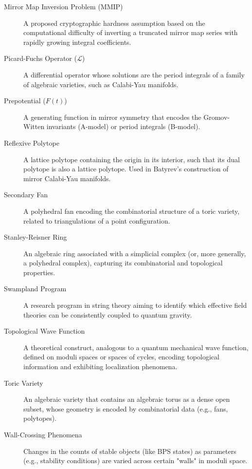 \documentclass{book}
\newcommand{\tmap}{t} %
\newcommand{\Fgen}{F} %
\theoremstyle{definition}
\begin{document}
\begin{description}
    \item[Mirror Map Inversion Problem (MMIP)] A proposed cryptographic hardness assumption based on the computational difficulty of inverting a truncated mirror map series with rapidly growing integral coefficients.
    \item[Picard-Fuchs Operator ($\mathcal{L}$)] A differential operator whose solutions are the period integrals of a family of algebraic varieties, such as Calabi-Yau manifolds.
    \item[Prepotential ($\Fgen(\tmap)$)] A generating function in mirror symmetry that encodes the Gromov-Witten invariants (A-model) or period integrals (B-model).
    \item[Reflexive Polytope] A lattice polytope containing the origin in its interior, such that its dual polytope is also a lattice polytope. Used in Batyrev's construction of mirror Calabi-Yau manifolds.
    \item[Secondary Fan] A polyhedral fan encoding the combinatorial structure of a toric variety, related to triangulations of a point configuration.
    \item[Stanley-Reisner Ring] An algebraic ring associated with a simplicial complex (or, more generally, a polyhedral complex), capturing its combinatorial and topological properties.
    \item[Swampland Program] A research program in string theory aiming to identify which effective field theories can be consistently coupled to quantum gravity.
    \item[Topological Wave Function] A theoretical construct, analogous to a quantum mechanical wave function, defined on moduli spaces or spaces of cycles, encoding topological information and exhibiting localization phenomena.
    \item[Toric Variety] An algebraic variety that contains an algebraic torus as a dense open subset, whose geometry is encoded by combinatorial data (e.g., fans, polytopes).
    \item[Wall-Crossing Phenomena] Changes in the counts of stable objects (like BPS states) as parameters (e.g., stability conditions) are varied across certain "walls" in moduli space.
\end{description}



\end{document}
